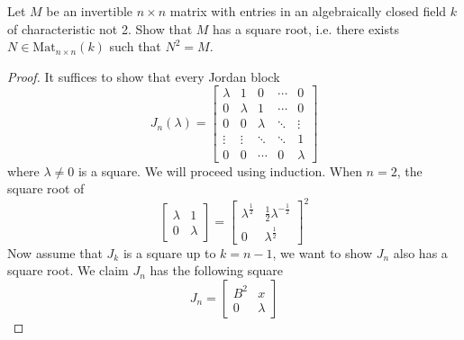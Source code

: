 \begin{prob}[S2017-Q4]
    Let \(M\) be an invertible \(n\times n\) matrix with entries in an algebraically closed field \(k\) of characteristic not 2. Show that \(M\) has a square root, i.e. there exists \(N\in\text{Mat}_{n\times n}(k)\) such that \(N^{2}=M\).
\end{prob}
\begin{proof}
    It suffices to show that every Jordan block 
    \[
        J_n(\lambda) = 
        \begin{bmatrix}
        \lambda & 1       & 0       & \cdots & 0 \\
        0       & \lambda & 1       & \cdots & 0 \\
        0       & 0       & \lambda & \ddots & \vdots \\
        \vdots  & \vdots  & \ddots  & \ddots & 1 \\
        0       & 0       & \cdots  & 0      & \lambda
        \end{bmatrix}
        \]
        where $\lambda\neq 0$ is a square. We will proceed using induction. When $n=2$, the square root of 
        \begin{equation*}
            \begin{bmatrix}
                \lambda&1\\
                0&\lambda
            \end{bmatrix}=\begin{bmatrix}
                \lambda^\frac{1}{2}&\frac{1}{2}\lambda^{-\frac{1}{2}}\\
                0&\lambda^\frac{1}{2}
            \end{bmatrix}^2
        \end{equation*} 
        Now assume that $J_{k}$ is a square up to $k=n-1$, we want to show $J_n$ also has a square root. We claim $J_n$ has the following square 
        \begin{equation*}
            J_n=\begin{bmatrix}
                B^2&x\\
                0&\lambda


\end{bmatrix}
\end{equation*}
\end{proof}

